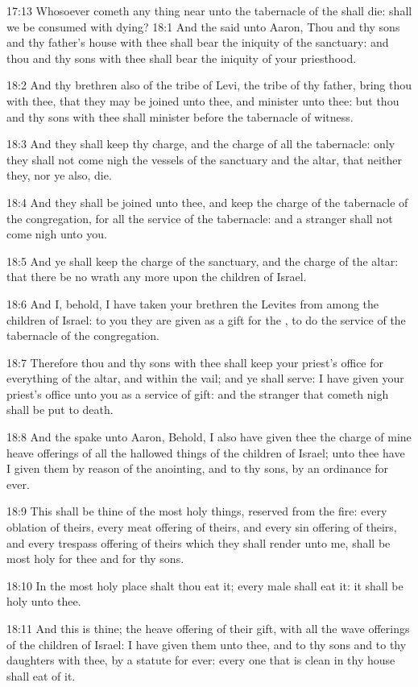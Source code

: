17:13 Whosoever cometh any thing near unto the tabernacle of the \LORD
shall die: shall we be consumed with dying?  18:1 And the \LORD said
unto Aaron, Thou and thy sons and thy father's house with thee shall
bear the iniquity of the sanctuary: and thou and thy sons with thee
shall bear the iniquity of your priesthood.

18:2 And thy brethren also of the tribe of Levi, the tribe of thy
father, bring thou with thee, that they may be joined unto thee, and
minister unto thee: but thou and thy sons with thee shall minister
before the tabernacle of witness.

18:3 And they shall keep thy charge, and the charge of all the
tabernacle: only they shall not come nigh the vessels of the sanctuary
and the altar, that neither they, nor ye also, die.

18:4 And they shall be joined unto thee, and keep the charge of the
tabernacle of the congregation, for all the service of the tabernacle:
and a stranger shall not come nigh unto you.

18:5 And ye shall keep the charge of the sanctuary, and the charge of
the altar: that there be no wrath any more upon the children of
Israel.

18:6 And I, behold, I have taken your brethren the Levites from among
the children of Israel: to you they are given as a gift for the \LORD,
to do the service of the tabernacle of the congregation.

18:7 Therefore thou and thy sons with thee shall keep your priest's
office for everything of the altar, and within the vail; and ye shall
serve: I have given your priest's office unto you as a service of
gift: and the stranger that cometh nigh shall be put to death.

18:8 And the \LORD spake unto Aaron, Behold, I also have given thee the
charge of mine heave offerings of all the hallowed things of the
children of Israel; unto thee have I given them by reason of the
anointing, and to thy sons, by an ordinance for ever.

18:9 This shall be thine of the most holy things, reserved from the
fire: every oblation of theirs, every meat offering of theirs, and
every sin offering of theirs, and every trespass offering of theirs
which they shall render unto me, shall be most holy for thee and for
thy sons.

18:10 In the most holy place shalt thou eat it; every male shall eat
it: it shall be holy unto thee.

18:11 And this is thine; the heave offering of their gift, with all
the wave offerings of the children of Israel: I have given them unto
thee, and to thy sons and to thy daughters with thee, by a statute for
ever: every one that is clean in thy house shall eat of it.

